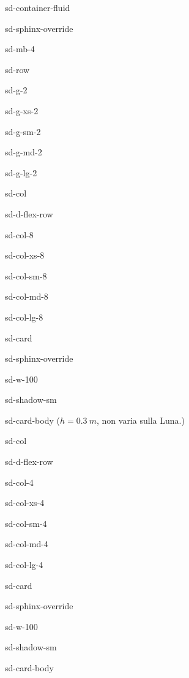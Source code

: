 \documentclass[letterpaper,10pt,italian]{jupyterBook}
\begin{document}
\begin{sphinxuseclass}{sd-container-fluid}
\begin{sphinxuseclass}{sd-sphinx-override}
\begin{sphinxuseclass}{sd-mb-4}
\begin{sphinxuseclass}{sd-row}
\begin{sphinxuseclass}{sd-g-2}
\begin{sphinxuseclass}{sd-g-xs-2}
\begin{sphinxuseclass}{sd-g-sm-2}
\begin{sphinxuseclass}{sd-g-md-2}
\begin{sphinxuseclass}{sd-g-lg-2}
\begin{sphinxuseclass}{sd-col}
\begin{sphinxuseclass}{sd-d-flex-row}
\begin{sphinxuseclass}{sd-col-8}
\begin{sphinxuseclass}{sd-col-xs-8}
\begin{sphinxuseclass}{sd-col-sm-8}
\begin{sphinxuseclass}{sd-col-md-8}
\begin{sphinxuseclass}{sd-col-lg-8}
\begin{sphinxuseclass}{sd-card}
\begin{sphinxuseclass}{sd-sphinx-override}
\begin{sphinxuseclass}{sd-w-100}
\begin{sphinxuseclass}{sd-shadow-sm}
\begin{sphinxuseclass}{sd-card-body}
\sphinxAtStartPar
(\(h=0.3\  m\), non varia sulla Luna.)

\end{sphinxuseclass}
\end{sphinxuseclass}
\end{sphinxuseclass}
\end{sphinxuseclass}
\end{sphinxuseclass}
\end{sphinxuseclass}
\end{sphinxuseclass}
\end{sphinxuseclass}
\end{sphinxuseclass}
\end{sphinxuseclass}
\end{sphinxuseclass}
\end{sphinxuseclass}
\begin{sphinxuseclass}{sd-col}
\begin{sphinxuseclass}{sd-d-flex-row}
\begin{sphinxuseclass}{sd-col-4}
\begin{sphinxuseclass}{sd-col-xs-4}
\begin{sphinxuseclass}{sd-col-sm-4}
\begin{sphinxuseclass}{sd-col-md-4}
\begin{sphinxuseclass}{sd-col-lg-4}
\begin{sphinxuseclass}{sd-card}
\begin{sphinxuseclass}{sd-sphinx-override}
\begin{sphinxuseclass}{sd-w-100}
\begin{sphinxuseclass}{sd-shadow-sm}
\begin{sphinxuseclass}{sd-card-body}
\sphinxAtStartPar
{}


\end{sphinxuseclass}
\end{sphinxuseclass}
\end{sphinxuseclass}
\end{sphinxuseclass}
\end{sphinxuseclass}
\end{sphinxuseclass}
\end{sphinxuseclass}
\end{sphinxuseclass}
\end{sphinxuseclass}
\end{sphinxuseclass}
\end{sphinxuseclass}
\end{sphinxuseclass}
\end{sphinxuseclass}
\end{sphinxuseclass}
\end{sphinxuseclass}
\end{sphinxuseclass}
\end{sphinxuseclass}
\end{sphinxuseclass}
\end{sphinxuseclass}
\end{sphinxuseclass}
\end{sphinxuseclass}
\end{document}
